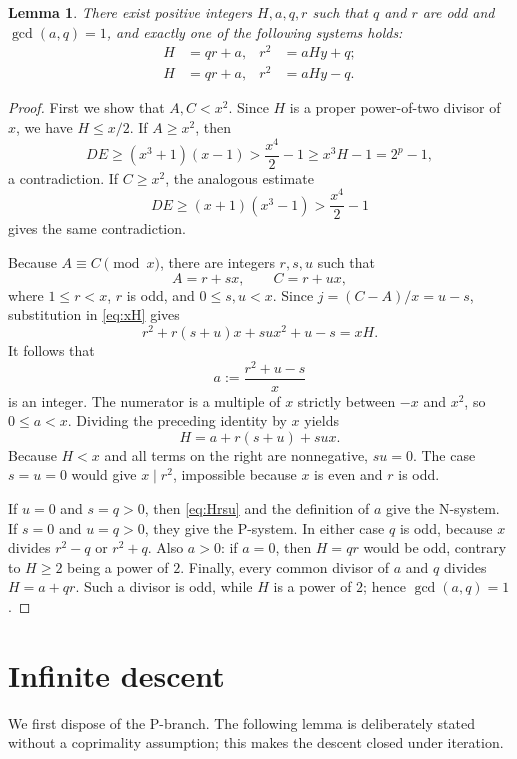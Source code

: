 \documentclass[11pt]{amsart}
\newtheorem{lemma}[theorem]{Lemma}
\theoremstyle{remark}
\begin{document}
\begin{lemma}\label{lem:two-branches}
There exist positive integers $H,a,q,r$ such that $q$ and $r$ are
odd and $\gcd(a,q)=1$, and exactly one of the following systems holds:
\begin{align}
 H&=qr+a, & r^2&=aHy+q; \tag{N}\label{eq:N}\\[2mm]
 H&=qr+a, & r^2&=aHy-q. \tag{P}\label{eq:P}
\end{align}
\end{lemma}

\begin{proof}
First we show that $A,C<x^2$.  Since $H$ is a proper power-of-two
divisor of $x$, we have $H\le x/2$.  If $A\ge x^2$, then
\[
 DE\ge(x^3+1)(x-1)
    >\frac{x^4}{2}-1
    \ge x^3H-1
    =2^p-1,
\]
a contradiction.  If $C\ge x^2$, the analogous estimate
\[
 DE\ge(x+1)(x^3-1)>\frac{x^4}{2}-1
\]
gives the same contradiction.

Because $A\equiv C\pmod x$, there are integers $r,s,u$ such that
\[
 A=r+sx,
 \qquad
 C=r+ux,
\]
where $1\le r<x$, $r$ is odd, and $0\le s,u<x$.  Since
$j=(C-A)/x=u-s$, substitution in \eqref{eq:xH} gives
\[
 r^2+r(s+u)x+sux^2+u-s=xH.
\]
It follows that
\[
 a:=\frac{r^2+u-s}{x}
\]
is an integer.  The numerator is a multiple of $x$ strictly between
$-x$ and $x^2$, so $0\le a<x$.  Dividing the preceding identity by
$x$ yields
\begin{equation}\label{eq:Hrsu}
 H=a+r(s+u)+sux.
\end{equation}
Because $H<x$ and all terms on the right are nonnegative, $su=0$.
The case $s=u=0$ would give $x\mid r^2$, impossible because $x$ is
even and $r$ is odd.

If $u=0$ and $s=q>0$, then \eqref{eq:Hrsu} and the definition of
$a$ give the N-system.  If $s=0$ and $u=q>0$, they give the
P-system.  In either case $q$ is odd, because $x$ divides $r^2-q$
or $r^2+q$.  Also $a>0$: if $a=0$, then $H=qr$ would be odd,
contrary to $H\ge2$ being a power of $2$.  Finally, every common
divisor of $a$ and $q$ divides $H=a+qr$.  Such a divisor is odd,
while $H$ is a power of $2$; hence $\gcd(a,q)=1$.
\end{proof}

\section{Infinite descent}

We first dispose of the P-branch.  The following lemma is deliberately
stated without a coprimality assumption; this makes the descent closed
under iteration.
\end{document}
